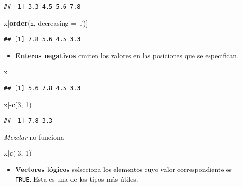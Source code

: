\documentclass[]{article}
\newenvironment{Shaded}{\begin{snugshade}}{\end{snugshade}}
\newcommand{\KeywordTok}[1]{\textcolor[rgb]{0.13,0.29,0.53}{\textbf{{#1}}}}
\newcommand{\DataTypeTok}[1]{\textcolor[rgb]{0.13,0.29,0.53}{{#1}}}
\newcommand{\DecValTok}[1]{\textcolor[rgb]{0.00,0.00,0.81}{{#1}}}
\newcommand{\NormalTok}[1]{{#1}}
\begin{document}
\begin{verbatim}
## [1] 3.3 4.5 5.6 7.8
\end{verbatim}

\begin{Shaded}
\begin{Highlighting}[]
\NormalTok{x[}\KeywordTok{order}\NormalTok{(x, }\DataTypeTok{decreasing =} \NormalTok{T)]}
\end{Highlighting}
\end{Shaded}

\begin{verbatim}
## [1] 7.8 5.6 4.5 3.3
\end{verbatim}

\begin{itemize}
\itemsep1pt\parskip0pt
\item
  \textbf{Enteros negativos} omiten los valores en las posiciones que se
  especifican.
\end{itemize}

\begin{Shaded}
\begin{Highlighting}[]
\NormalTok{x}
\end{Highlighting}
\end{Shaded}

\begin{verbatim}
## [1] 5.6 7.8 4.5 3.3
\end{verbatim}

\begin{Shaded}
\begin{Highlighting}[]
\NormalTok{x[-}\KeywordTok{c}\NormalTok{(}\DecValTok{3}\NormalTok{, }\DecValTok{1}\NormalTok{)]}
\end{Highlighting}
\end{Shaded}

\begin{verbatim}
## [1] 7.8 3.3
\end{verbatim}

\emph{Mezclar} no funciona.

\begin{Shaded}
\begin{Highlighting}[]
\NormalTok{x[}\KeywordTok{c}\NormalTok{(-}\DecValTok{3}\NormalTok{, }\DecValTok{1}\NormalTok{)]}
\end{Highlighting}
\end{Shaded}

\begin{itemize}
\itemsep1pt\parskip0pt
\item
  \textbf{Vectores lógicos} selecciona los elementos cuyo valor
  correspondiente es \texttt{TRUE}. Esta es una de los tipos más útiles.
\end{itemize}
\end{document}
